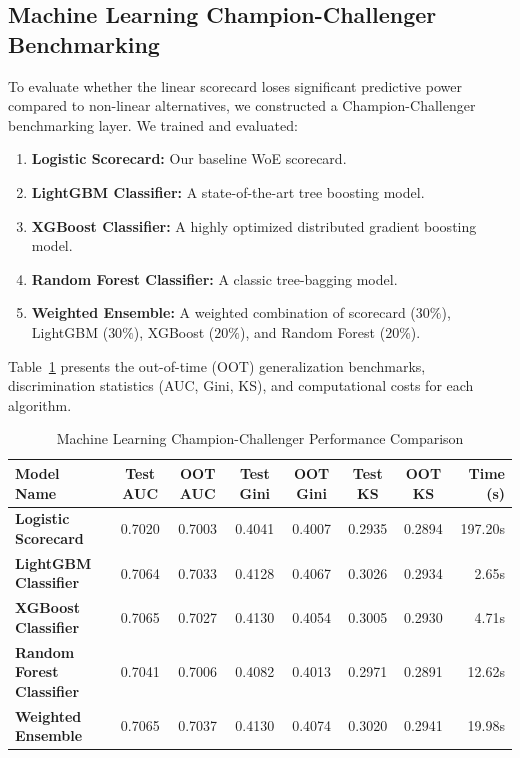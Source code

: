 \documentclass[11pt,a4paper]{article}
\begin{document}
\subsection{Machine Learning Champion-Challenger Benchmarking}

To evaluate whether the linear scorecard loses significant predictive power compared to non-linear alternatives, we constructed a Champion-Challenger benchmarking layer. We trained and evaluated:
\begin{enumerate}
    \item \textbf{Logistic Scorecard:} Our baseline WoE scorecard.
    \item \textbf{LightGBM Classifier:} A state-of-the-art tree boosting model.
    \item \textbf{XGBoost Classifier:} A highly optimized distributed gradient boosting model.
    \item \textbf{Random Forest Classifier:} A classic tree-bagging model.
    \item \textbf{Weighted Ensemble:} A weighted combination of scorecard ($30\%$), LightGBM ($30\%$), XGBoost ($20\%$), and Random Forest ($20\%$).
\end{enumerate}

Table~\ref{tab:ml_comparison} presents the out-of-time (OOT) generalization benchmarks, discrimination statistics (AUC, Gini, KS), and computational costs for each algorithm.

\begin{table}[H]
\centering
\small
\setlength{\tabcolsep}{3.2pt}
\caption{Machine Learning Champion-Challenger Performance Comparison}
\label{tab:ml_comparison}
\vspace{0.5em}
\begin{tabular}{lccccccr}
\toprule
\textbf{Model Name} & \textbf{Test AUC} & \textbf{OOT AUC} & \textbf{Test Gini} & \textbf{OOT Gini} & \textbf{Test KS} & \textbf{OOT KS} & \textbf{Time (s)} \\
\midrule
\textbf{Logistic Scorecard} & 0.7020 & 0.7003 & 0.4041 & 0.4007 & 0.2935 & 0.2894 & 197.20s \\
\textbf{LightGBM Classifier} & 0.7064 & 0.7033 & 0.4128 & 0.4067 & 0.3026 & 0.2934 & 2.65s \\
\textbf{XGBoost Classifier} & 0.7065 & 0.7027 & 0.4130 & 0.4054 & 0.3005 & 0.2930 & 4.71s \\
\textbf{Random Forest Classifier} & 0.7041 & 0.7006 & 0.4082 & 0.4013 & 0.2971 & 0.2891 & 12.62s \\
\textbf{Weighted Ensemble} & 0.7065 & 0.7037 & 0.4130 & 0.4074 & 0.3020 & 0.2941 & 19.98s \\
\bottomrule
\end{tabular}
\end{table}
\end{document}

